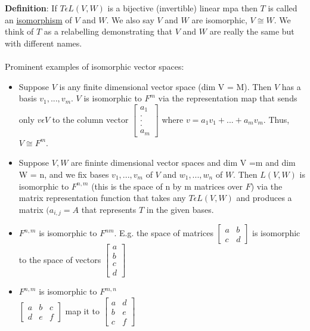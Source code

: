 \documentclass{article}
\begin{document}
\textbf{Definition}: If $T\epsilon L(V,W)$ is a bijective (invertible) linear mpa then $T$ is called an \underline{isomorphism} of $V$ and $W$. We also say $V$ and $W$ are isomorphic, $V \cong W$. We think of $T$ as a relabelling demonstrating that $V$ and $W$ are really the same but with different names. \\\\
Prominent examples of isomorphic vector spaces: 
\begin{itemize}
    \item Suppose $V$ is any finite dimensional vector space (dim V = M). Then $V$ has a basis $v_1, ..., v_m$. $V$ is isomorphic to $F^m$ via the representation map that sends only $v \epsilon V$ to the column vector $\begin{bmatrix} a_1\\.\\.\\.\\a_m \end{bmatrix}$ where $v = a_1v_1 + ... + a_mv_m$. Thus, $V \cong F^m$. 
    \item Suppose $V,W$ are fininte dimensional vector spaces and dim V =m and dim W = n, and we fix bases $v_1,..., v_m$ of $V$ and $w_1,..., w_n$ of $W$. Then $L(V,W)$ is isomorphic to $F^{n,m}$ (this is the space of n by m matrices over $F$) via the matrix representation function that takes any $T \epsilon L(V,W)$ and produces a matrix $(a_{i,j} = A$ that represents $T$ in the given bases. 
    \item $F^{n,m}$ is isomorphic to $F^{nm}$. E.g. the space of matrices $\begin{bmatrix} a &b\\c&d \end{bmatrix}$ is isomorphic to the space of vectors $\begin{bmatrix}
        a\\b\\c\\d
    \end{bmatrix}$
    \item $F^{n,m}$ is isomorphic to $F^{m,n}$\\
    $\begin{bmatrix}
        a&b&c\\d&e&f
    \end{bmatrix}$ 
    map it to $\begin{bmatrix}
        a&d\\b&e\\c&f
    \end{bmatrix}$


\end{itemize}
\end{document}
